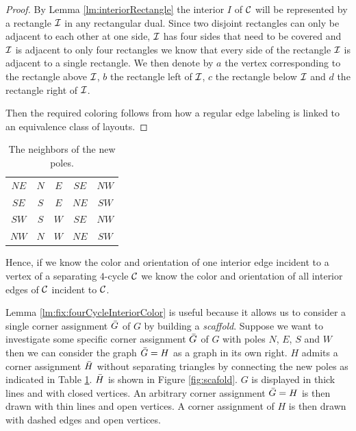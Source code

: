  \begin{proof}
  By Lemma \ref{lm:interiorRectangle} the interior $I$ of $\mathcal{C}$ will be represented by a rectangle $\mathcal{I}$ in any rectangular dual. Since two disjoint rectangles can only be adjacent to each other at one side, $\mathcal{I}$ has four sides that need to be covered and $\mathcal{I}$ is adjacent to only four rectangles we know that every side of the rectangle $\mathcal{I}$ is adjacent to a single rectangle. We then denote by $a$ the vertex corresponding to the rectangle above $\mathcal{I}$, $b$ the rectangle left of $\mathcal{I}$, $c$ the rectangle below $\mathcal{I}$ and $d$ the rectangle right of $\mathcal{I}$.

  Then the required coloring follows from how a regular edge labeling is linked to an equivalence class of layouts.

  \end{proof}

  \begin{table}
    \centering
    \begin{tabular}{c|| c c c c}
      $NE$ & $N$ & $ E$ & $ SE$ & $ NW$ \\
      $SE$ & $S$ & $ E$ & $ NE$ & $ SW$\\
      $SW$ & $S$ & $ W$ & $ SE$ & $ NW$\\
      $NW$ & $N$ & $ W$ & $ NE$ & $ SW$\\
    \end{tabular}
    \caption{The neighbors of the new poles.}
    \label{tab:scaffold}
  \end{table}

  Hence, if we know the color and orientation of one interior edge incident to a vertex of a separating $4$-cycle $\mathcal{C}$ we know the color and orientation of all interior edges of $\mathcal{C}$ incident to $\mathcal{C}$.

  Lemma \ref{lm:fix:fourCycleInteriorColor} is useful because it allows us to consider a single corner assignment $\bar{G}$ of $G$ by building a \emph{scaffold}. Suppose we want to investigate some specific corner assignment $\bar{G}$ of $G$ with poles $N$, $E$, $S$ and $W$ then we can consider the graph $\bar{G} = H$ as a graph in its own right.
  $H$ admits a corner assignment $\bar{H}$ without separating triangles by connecting the new poles as indicated in Table \ref{tab:scaffold}.
  $\bar{H}$ is shown in Figure \ref{fig:scafold}.
  $G$ is displayed in thick lines and with closed vertices.
  An arbitrary corner assignment $\bar{G} =H$ is then drawn with thin lines and open vertices.
  A corner assignment of $H$ is then drawn with dashed edges and open vertices.

